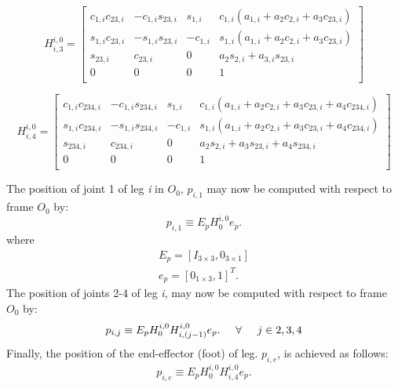 				\begin{equation}
					H^{i,0}_{i,3} =\left[ 
					\begin{array}{ccc|c}
						c_{1,i} c_{23,i}	&  		-c_{1,i} s_{23,i}	& 		s_{1,i}		&		c_{1,i}( a_{1,i} + a_2 c_{2,i} + a_3 c_{23,i} )	\\
						s_{1,i} c_{23,i}	&  		-s_{1,i} s_{23,i}	& 		-c_{1,i}	&		s_{1,i}( a_{1,i} + a_2 c_{2,i} + a_3 c_{23,i} )	\\
						s_{23,i} 		&  		c_{23,i}			& 		0			&		a_2 s_{2,i} + a_{3,i} s_{23,i}			\\ \hline
						0 			&  		0					& 		0			&		1 										\\
					\end{array} 
					\right]
				\end{equation}

				\begin{equation}
					H^{i,0}_{i,4} =\left[ 
					\begin{array}{ccc|c}
						c_{1,i} c_{234,i}	&  		-c_{1,i} s_{234,i}	& 		s_{1,i}		&		c_{1,i}( a_{1,i} + a_2 c_{2,i} + a_3 c_{23,i} + a_4 c_{234,i} )		\\
						s_{1,i} c_{234,i}	&  		-s_{1,i} s_{234,i}	& 		-c_{1,i}	&		s_{1,i}( a_{1,i} + a_2 c_{2,i} + a_3 c_{23,i} + a_4 c_{234,i} )		\\
						s_{234,i} 		&  		c_{234,i}		& 		0			&		a_2 s_{2,i} + a_3 s_{23,i} + a_4 s_{234,i}					\\ \hline
						0 			& 		0			& 		0			&		1 															\\
					\end{array} 
					\right]
				\end{equation}

			\noindent
			The position of joint 1 of leg \emph{i} in $O_{0}$, ${p}_{i,1}$ may now be computed with respect to frame $O_{0}$ by:
				\begin{equation}
					{p}_{i,1} \equiv E_{p} H_{0}^{i,0} e_{p}.
				\end{equation}
			where
				\begin{eqnarray}
					E_{p} = [I_{3\times3},0_{3\times1}]	\nonumber 	\\
					e_{p} = [0_{1\times3},1]^T.			\nonumber 	
				\end{eqnarray}
			The position of joints 2-4 of leg \emph{i}, may now be computed with respect to frame $O_{0}$ by:
				\begin{equation}
					{p}_{i,j} \equiv E_{p} H_{0}^{i,0} {H}^{i,0}_{i,(j-1)} e_{p}. \hspace{5mm} \forall \hspace{5mm} j\in{2,3,4}
				\end{equation}
			Finally, the position of the end-effector (foot) of \Ith leg. ${p}_{i,e}$, is achieved as follows:
				\begin{equation}
					{p}_{i,e} \equiv E_{p} H_{0}^{i,0} {H}^{i,0}_{i,4} e_{p}.
				\end{equation}


